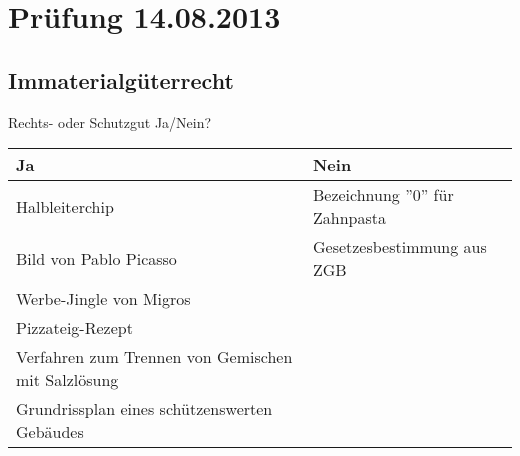 \section{Prüfung 14.08.2013}

\subsection{Immaterialgüterrecht}
Rechts- oder Schutzgut Ja/Nein?\\
\begin{tabular}{|l|l|}
	\hline 
	\textbf{Ja} & \textbf{Nein} \\ 
	\hline 
	Halbleiterchip & Bezeichnung ''0'' für Zahnpasta \\ 
	\hline 
	Bild von Pablo Picasso & Gesetzesbestimmung aus ZGB \\
	\hline
	Werbe-Jingle von Migros & \\
	\hline
	Pizzateig-Rezept &  \\
	\hline
	Verfahren zum Trennen von Gemischen mit Salzlösung & \\
	\hline
	Grundrissplan eines schützenswerten Gebäudes &  \\
	\hline
\end{tabular}

